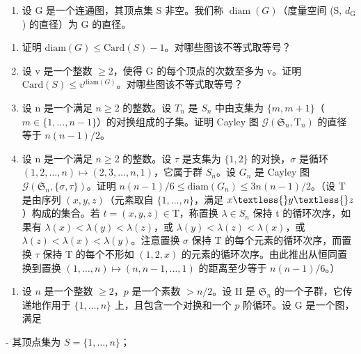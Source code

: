 \begin{enumerate}
\def\labelenumi{\arabic{enumi})}
\setcounter{enumi}{10}
\tightlist
\item
  设 G 是一个连通图，其顶点集 S 非空。我们称 \(\operatorname{diam}(G)\)（度量空间 (S, \(d_{\mathrm{G}}\)) 的直径）为 G 的直径。
\end{enumerate}

\begin{enumerate}
\def\labelenumi{\alph{enumi})}
\item
  证明 \(\text{diam}(G) \leqslant \text{Card}(S)-1\)。对哪些图该不等式取等号？
\item
  设 v 是一个整数 \(\geqslant 2\)，使得 G 的每个顶点的次数至多为 v。证明 \(\text{Card}(S) \leqslant v^{\text{diam}(G)}\)。对哪些图该不等式取等号？
\item
  设 n 是一个满足 \(n \geqslant 2\) 的整数。设 \(T_{n}\) 是 \(S_{n}\) 中由支集为 \(\{m, m + 1\}\)（\(m \in \{1, \ldots, n - 1\}\)）的对换组成的子集。证明 Cayley 图 \(\mathcal{G}(\mathfrak{S}_{n}, \mathrm{T}_{n})\) 的直径等于 \(n(n - 1)/2\)。
\item
  设 n 是一个满足 \(n \geqslant 2\) 的整数。设 \(\tau\) 是支集为 \(\{1,2\}\) 的对换，\(\sigma\) 是循环 \((1,2,\ldots,n) \mapsto (2,3,\ldots,n,1)\)，它属于群 \(S_n\)。设 \(G_n\) 是 Cayley 图 \(\mathcal{G}(\mathfrak{S}_n,\{\sigma,\tau\})\)。证明 \(n(n-1)/6 \leqslant \text{diam}(G_n) \leqslant 3n(n-1)/2\)。（设 T 是由序列 \((x,y,z)\)（元素取自 \(\{1,\ldots,n\}\)，满足 \(x \textless{} y \textless{} z\)）构成的集合。若 \(t=(x,y,z)\in\text{T}\)，称置换 \(\lambda\in S_n\) 保持 t 的循环次序，如果有 \(\lambda(x)<\lambda(y)<\lambda(z)\)，或 \(\lambda(y)<\lambda(z)<\lambda(x)\)，或 \(\lambda(z)<\lambda(x)<\lambda(y)\)。注意置换 \(\sigma\) 保持 T 的每个元素的循环次序，而置换 \(\tau\) 保持 T 的每个不形如 \((1,2,x)\) 的元素的循环次序。由此推出从恒同置换到置换 \((1,\ldots,n) \mapsto (n,n-1,\ldots,1)\) 的距离至少等于 \(n(n-1)/6\)。）
\end{enumerate}

\begin{enumerate}
\def\labelenumi{\arabic{enumi})}
\setcounter{enumi}{11}
\tightlist
\item
  设 \(n\) 是一个整数 \(\geqslant 2\)，\(p\) 是一个素数 \(>n/2\)。设 H 是 \(\mathfrak{S}_n\) 的一个子群，它传递地作用于 \(\{1, \ldots, n\}\) 上，且包含一个对换和一个 \(p\) 阶循环。设 G 是一个图，满足
\end{enumerate}

- 其顶点集为 \(S = \{1, \ldots, n\}\)；

